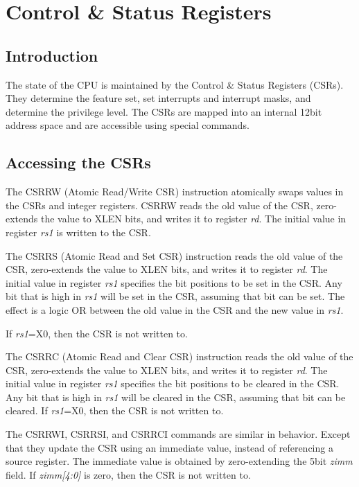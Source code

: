 \chapter{Control \& Status Registers}\label{control-status-registers}

\section{Introduction}\label{introduction-3}

The state of the CPU is maintained by the Control \& Status Registers
(CSRs). They determine the feature set, set interrupts and interrupt
masks, and determine the privilege level. The CSRs are mapped into an
internal 12bit address space and are accessible using special commands.

\section{Accessing the CSRs}\label{accessing-the-csrs}



The CSRRW (Atomic Read/Write CSR) instruction atomically swaps values in
the CSRs and integer registers. CSRRW reads the old value of the CSR,
zero-extends the value to XLEN bits, and writes it to register
\emph{rd}. The initial value in register \emph{rs1} is written to the
CSR.

The CSRRS (Atomic Read and Set CSR) instruction reads the old value of
the CSR, zero-extends the value to XLEN bits, and writes it to register
\emph{rd}. The initial value in register \emph{rs1} specifies the bit
positions to be set in the CSR. Any bit that is high in \emph{rs1} will
be set in the CSR, assuming that bit can be set. The effect is a logic
OR between the old value in the CSR and the new value in \emph{rs1}.

If \emph{rs1}=X0, then the CSR is not written to.

The CSRRC (Atomic Read and Clear CSR) instruction reads the old value of
the CSR, zero-extends the value to XLEN bits, and writes it to register
\emph{rd}. The initial value in register \emph{rs1} specifies the bit
positions to be cleared in the CSR. Any bit that is high in \emph{rs1}
will be cleared in the CSR, assuming that bit can be cleared. If
\emph{rs1}=X0, then the CSR is not written to.

The CSRRWI, CSRRSI, and CSRRCI commands are similar in behavior. Except
that they update the CSR using an immediate value, instead of
referencing a source register. The immediate value is obtained by
zero-extending the 5bit \emph{zimm} field. If \emph{zimm[4:0]} is
zero, then the CSR is not written to.

